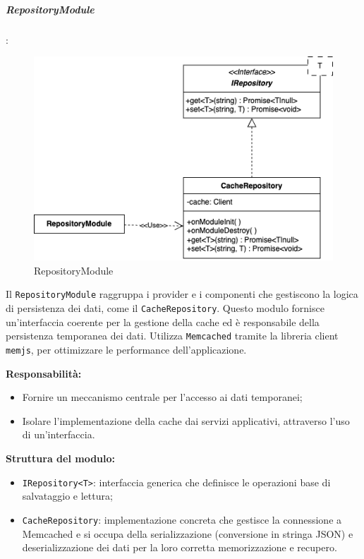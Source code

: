 \subparagraph{RepositoryModule}:

\begin{figure}[H] 
    \centering
    \includegraphics[scale = 0.5]{template/images/uml_back/RepositoryModule.png}
    \caption{RepositoryModule}
\end{figure}

Il \texttt{RepositoryModule} raggruppa i provider e i componenti che gestiscono la logica di persistenza dei dati, come il \texttt{CacheRepository}. Questo modulo fornisce un'interfaccia coerente per la gestione della cache ed è responsabile della persistenza temporanea dei dati. Utilizza \texttt{Memcached} tramite la libreria client \texttt{memjs}, per ottimizzare le performance dell'applicazione.

\textbf{Responsabilità:}
\begin{itemize}
    \item Fornire un meccanismo centrale per l’accesso ai dati temporanei;
    \item Isolare l’implementazione della cache dai servizi applicativi, attraverso l’uso di un’interfaccia.
\end{itemize}

\textbf{Struttura del modulo:}
\begin{itemize}
    \item \texttt{IRepository<T>}: interfaccia generica che definisce le operazioni base di salvataggio e lettura;
    \item \texttt{CacheRepository}: implementazione concreta che gestisce la connessione a Memcached e si occupa della serializzazione (conversione in stringa JSON) e deserializzazione dei dati per la loro corretta memorizzazione e recupero.
\end{itemize}

